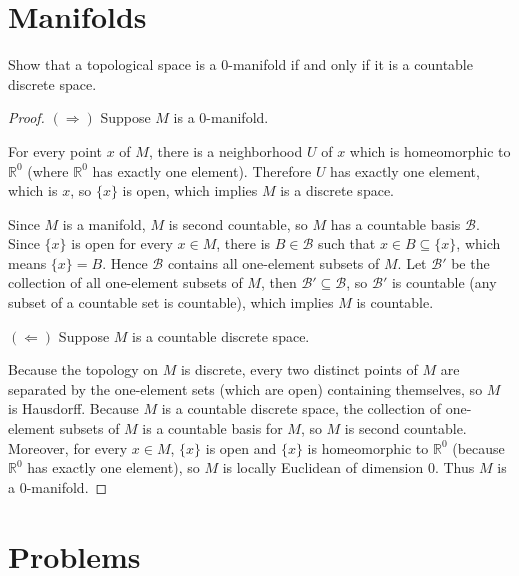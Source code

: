 \section*{Manifolds}

\begin{exercise}{2.54}
	Show that a topological space is a $0$-manifold if and only if it is a countable discrete space.
\end{exercise}

\begin{proof}
	$(\Rightarrow)$ Suppose $M$ is a $0$-manifold.

	For every point $x$ of $M$, there is a neighborhood $U$ of $x$ which is homeomorphic to $\mathbb{R}^{0}$ (where $\mathbb{R}^{0}$ has exactly one element). Therefore $U$ has exactly one element, which is $x$, so $\{ x \}$ is open, which implies $M$ is a discrete space.

	Since $M$ is a manifold, $M$ is second countable, so $M$ has a countable basis $\mathscr{B}$. Since $\{ x \}$ is open for every $x\in M$, there is $B\in\mathscr{B}$ such that $x\in B\subseteq \{x\}$, which means $\{ x \} = B$. Hence $\mathscr{B}$ contains all one-element subsets of $M$. Let $\mathscr{B}'$ be the collection of all one-element subsets of $M$, then $\mathscr{B}'\subseteq\mathscr{B}$, so $\mathscr{B}'$ is countable (any subset of a countable set is countable), which implies $M$ is countable.

	$(\Leftarrow)$ Suppose $M$ is a countable discrete space.

	Because the topology on $M$ is discrete, every two distinct points of $M$ are separated by the one-element sets (which are open) containing themselves, so $M$ is Hausdorff. Because $M$ is a countable discrete space, the collection of one-element subsets of $M$ is a countable basis for $M$, so $M$ is second countable. Moreover, for every $x\in M$, $\{ x \}$ is open and $\{ x \}$ is homeomorphic to $\mathbb{R}^{0}$ (because $\mathbb{R}^{0}$ has exactly one element), so $M$ is locally Euclidean of dimension $0$. Thus $M$ is a $0$-manifold.
\end{proof}

\section*{Problems}

